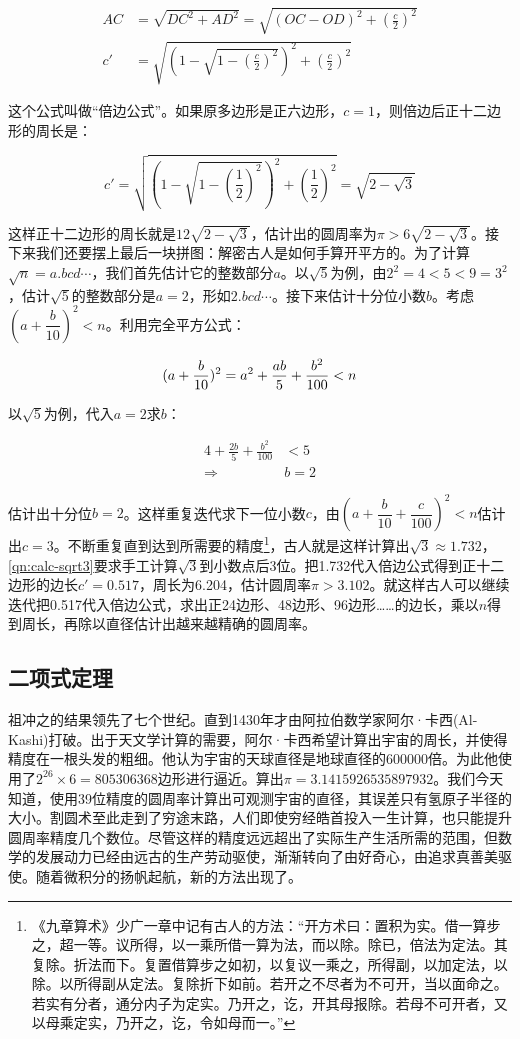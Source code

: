 \documentclass[b5paper]{ctexart}
\begin{document}
\begin{align}
AC &= \sqrt{DC^2 + AD^2} = \sqrt{(OC - OD)^2 + (\frac{c}{2})^2}  \\
c' &= \sqrt{(1 - \sqrt{1 - (\frac{c}{2})^2})^2 + (\frac{c}{2})^2}
\label{eq:double-edges}
\end{align}

这个公式叫做“倍边公式”。如果原多边形是正六边形，$c = 1$，则倍边后正十二边形的周长是：

\[
c' = \sqrt{(1 - \sqrt{1 - (\frac{1}{2})^2})^2 + (\frac{1}{2})^2} = \sqrt{2 - \sqrt{3}}
\]

这样正十二边形的周长就是$12\sqrt{2 - \sqrt{3}}$，估计出的圆周率为$\pi > 6\sqrt{2 - \sqrt{3}}$。接下来我们还要摆上最后一块拼图：解密古人是如何手算开平方的。为了计算$\sqrt{n} = a.bcd\dotsm$，我们首先估计它的整数部分$a$。以$\sqrt{5}$为例，由$2^2 = 4 < 5 < 9 = 3^2$，估计$\sqrt{5}$的整数部分是$a = 2$，形如$2.bcd\dotsm$。接下来估计十分位小数$b$。考虑$(a + \dfrac{b}{10})^2 < n$。利用完全平方公式：

\[
(a + \frac{b}{10})^2 = a^2 + \frac{ab}{5} + \frac{b^2}{100}  < n \\
\]

以$\sqrt{5}$为例，代入$a = 2$求$b$：

\begin{align*}
4 + \frac{2b}{5} + \frac{b^2}{100} &< 5 \\
 \Rightarrow & b = 2
\end{align*}

估计出十分位$b = 2$。这样重复迭代求下一位小数$c$，由$(a + \dfrac{b}{10} + \dfrac{c}{100})^2 < n$估计出$c = 3$。不断重复直到达到所需要的精度\footnote{《九章算术》少广一章中记有古人的方法：“开方术曰：置积为实。借一算步之，超一等。议所得，以一乘所借一算为法，而以除。除已，倍法为定法。其复除。折法而下。复置借算步之如初，以复议一乘之，所得副，以加定法，以除。以所得副从定法。复除折下如前。若开之不尽者为不可开，当以面命之。若实有分者，通分内子为定实。乃开之，讫，开其母报除。若母不可开者，又以母乘定实，乃开之，讫，令如母而一。”}，古人就是这样计算出$\sqrt{3} \approx 1.732$，\cref{qn:calc-sqrt3}要求手工计算$\sqrt{3}$到小数点后3位。把1.732代入倍边公式得到正十二边形的边长$c' = 0.517$，周长为6.204，估计圆周率$\pi > 3.102$。就这样古人可以继续迭代把0.517代入倍边公式，求出正24边形、48边形、96边形……的边长，乘以$n$得到周长，再除以直径估计出越来越精确的圆周率。

\subsection{二项式定理}
祖冲之的结果领先了七个世纪。直到1430年才由阿拉伯数学家阿尔·卡西(Al-Kashi)打破。出于天文学计算的需要，阿尔·卡西希望计算出宇宙的周长，并使得精度在一根头发的粗细。他认为宇宙的天球直径是地球直径的600000倍。为此他使用了$2^{26} \times 6 = 805306368$边形进行逼近。算出$\pi = 3.1415926535897932$。我们今天知道，使用39位精度的圆周率计算出可观测宇宙的直径，其误差只有氢原子半径的大小。割圆术至此走到了穷途末路，人们即使穷经皓首投入一生计算，也只能提升圆周率精度几个数位。尽管这样的精度远远超出了实际生产生活所需的范围，但数学的发展动力已经由远古的生产劳动驱使，渐渐转向了由好奇心，由追求真善美驱使。随着微积分的扬帆起航，新的方法出现了。
\end{document}
